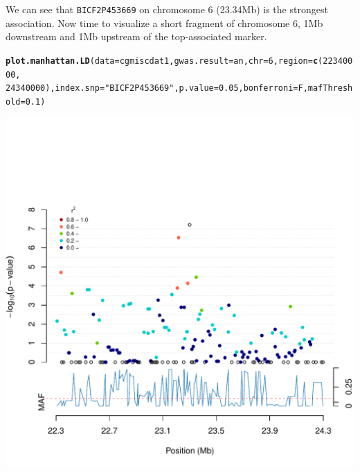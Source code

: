 \documentclass{article}\usepackage{graphicx, color}
\makeatletter
\def\maxwidth{ %
  \ifdim\Gin@nat@width>\linewidth
    \linewidth
  \else
    \Gin@nat@width
  \fi
}
\newcommand{\hlfunctioncall}[1]{\textcolor[rgb]{0.501960784313725,0,0.329411764705882}{\textbf{#1}}}%
\newcommand{\hlstring}[1]{\textcolor[rgb]{0.6,0.6,1}{#1}}%
\newenvironment{kframe}{%
 \def\at@end@of@kframe{}%
 \ifinner\ifhmode%
  \def\at@end@of@kframe{\end{minipage}}%
  \begin{minipage}{\columnwidth}%
 \fi\fi%
 \def\FrameCommand##1{\hskip\@totalleftmargin \hskip-\fboxsep
 \colorbox{shadecolor}{##1}\hskip-\fboxsep
     \hskip-\linewidth \hskip-\@totalleftmargin \hskip\columnwidth}%
 \MakeFramed {\advance\hsize-\width
   \@totalleftmargin\z@ \linewidth\hsize
   \@setminipage}}%
 {\par\unskip\endMakeFramed%
 \at@end@of@kframe}
\newenvironment{knitrout}{}{} %
\makeatother
\begin{document}
We can see that {\tt  ΒΙCF2P453669} on chromosome 6 (23.34Mb) is the strongest association. Now time to visualize a short fragment of chromosome 6, 1Mb downstream and 1Mb upstream of the top-associated marker.
\begin{knitrout}
\color{fgcolor}\begin{kframe}
\begin{alltt}
\hlfunctioncall{plot.manhattan.LD}(data = cgmiscdat1, gwas.result = an, chr = 6, region = \hlfunctioncall{c}(22340000, 
    24340000), index.snp = \hlstring{"BICF2P453669"}, p.value = 0.05, bonferroni = F, mafThreshold = 0.1)
\end{alltt}
\end{kframe}
\includegraphics[width=\maxwidth]{figure/plot_Manhattan_LD_3} 

\end{knitrout}
\end{document}
